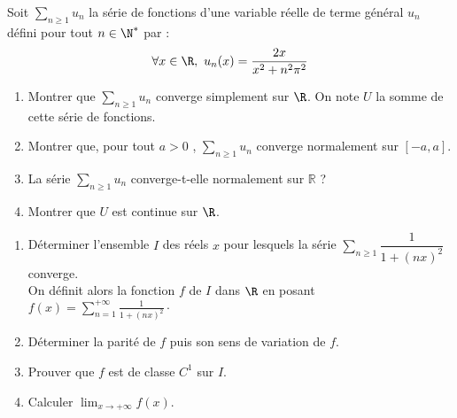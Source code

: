 \documentclass[twoside,a4paper,french,10pt]{VcCours}
\begin{document}
\begin{Exercice}
Soit $\sum_{n \geq 1} u_n$ la série de fonctions d'une variable réelle de terme général $u_n$ défini pour tout $n \in \N^*$ par : 
$$ \forall x \in \R ,\ u_n(x)=\dfrac{2x}{x^2+n^2\pi^2}$$
\begin{enumerate}
\item Montrer que $\sum_{n \geq 1} u_n$ converge simplement sur $\R$. On note $U$ la somme de cette  série de fonctions.
\item Montrer que, pour tout $a > 0$ , $\sum_{n \geq 1} u_n$ converge normalement sur $[-a,a]$.
\item La série $\sum_{n \geq 1} u_n$ converge-t-elle normalement sur $\mathbb{R}$ ?
\item Montrer que $U$ est continue sur $\R$.
\end{enumerate}
\end{Exercice} 

\begin{Exercice}
\begin{enumerate}
    \item Déterminer l'ensemble $I$ des réels $x$ pour lesquels la série $\sum_{n\geq 1} \dfrac{1}{1+(nx)^2}$ converge.\\
    On définit alors la fonction $f$ de $I$ dans $\R$ en posant $f(x)=\sum_{n=1}^{+\infty}\frac{1}{1+(nx)^2}\cdot$
    \item Déterminer la parité de $f$ puis son sens de variation de $f$. 
    \item Prouver que $f$ est de classe $C^1$ sur $I$.
    \item Calculer $\lim_{x\to +\infty}f(x)$.
    \end{enumerate}
\end{Exercice} 
\end{document}
